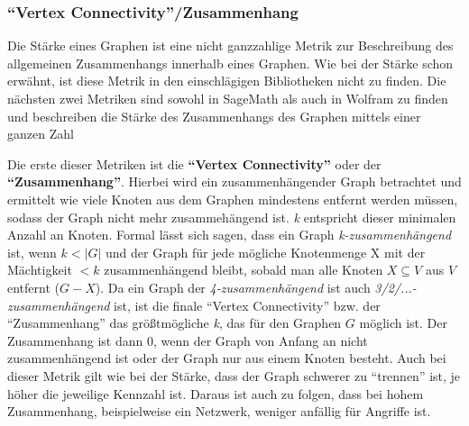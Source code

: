 \documentclass[a4paper,12pt,ngerman,chapterprefix=false,listof=totoc,bibliography=totoc]{scrreprt}
\begin{document}
\subsubsection*{"`Vertex Connectivity"'/Zusammenhang}
{
Die Stärke eines Graphen ist eine nicht ganzzahlige Metrik zur Beschreibung des allgemeinen Zusammenhangs innerhalb eines Graphen. Wie bei der Stärke schon erwähnt, ist diese Metrik in den einschlägigen Bibliotheken nicht zu finden. Die nächsten zwei Metriken sind sowohl in SageMath als auch in Wolfram zu finden und beschreiben die Stärke des Zusammenhangs des Graphen mittels einer ganzen Zahl \cite{sagemath_graph_2020,wolfram_graph_2020}

Die erste dieser Metriken ist die \textbf{"`Vertex Connectivity"'} oder der \textbf{"`Zusammenhang"'}. Hierbei wird ein zusammenhängender Graph betrachtet und ermittelt wie viele Knoten aus dem Graphen mindestens entfernt werden müssen, sodass der Graph nicht mehr zusammehängend ist. \textit{k} entspricht dieser minimalen Anzahl an Knoten. Formal lässt sich sagen, dass ein Graph \textit{k-zusammenhängend} ist, wenn \(k <\vert G\vert\) und der Graph für jede mögliche Knotenmenge X mit der Mächtigkeit \(< k\) zusammenhängend bleibt, sobald man alle Knoten \(X\subseteq V\) aus \(V\) entfernt (\(G - X\)). Da ein Graph der \textit{4-zusammenhängend} ist auch \textit{3/2/...-zusammenhängend} ist, ist die finale "`Vertex Connectivity"' bzw.  der "`Zusammenhang"' das größtmögliche \textit{k}, das für den Graphen \(G\) möglich ist. Der Zusammenhang ist dann 0, wenn der Graph von Anfang an nicht zusammenhängend ist oder der Graph nur aus einem Knoten besteht. \cite{diestel_graphentheorie_2000} Auch bei dieser Metrik gilt wie bei der Stärke, dass der Graph schwerer zu "`trennen"' ist, je höher die jeweilige Kennzahl ist. Daraus ist auch zu folgen, dass bei hohem Zusammenhang, beispielweise ein Netzwerk, weniger anfällig für Angriffe ist.

}
\end{document}
